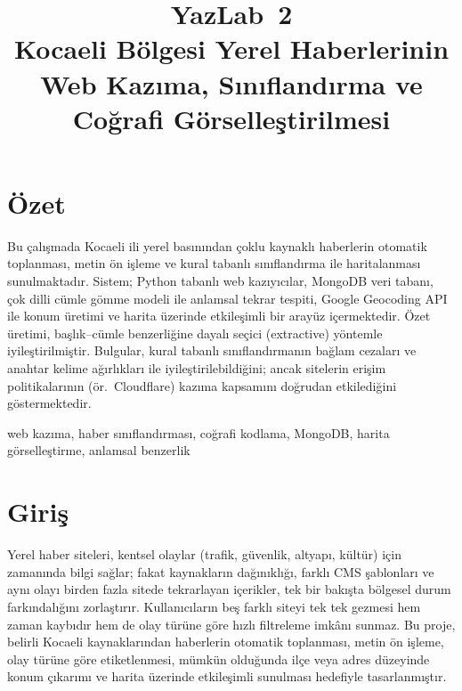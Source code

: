 \documentclass[conference,a4paper]{IEEEtran}
\begin{document}
\title{%
  {\large\bfseries YazLab~2}\\[0.55em]%
  Kocaeli Bölgesi Yerel Haberlerinin Web Kazıma, Sınıflandırma ve Coğrafi Görselleştirilmesi%
}

\author{
\and
{}
}

\maketitle

\section*{Özet}
{\normalfont\normalsize\mdseries\upshape
Bu çalışmada Kocaeli ili yerel basınından çoklu kaynaklı haberlerin otomatik toplanması, metin ön işleme ve kural tabanlı sınıflandırma ile haritalanması sunulmaktadır. Sistem; Python tabanlı web kazıyıcılar, MongoDB veri tabanı, çok dilli cümle gömme modeli ile anlamsal tekrar tespiti, Google Geocoding API ile konum üretimi ve harita üzerinde etkileşimli bir arayüz içermektedir. Özet üretimi, başlık--cümle benzerliğine dayalı seçici (extractive) yöntemle iyileştirilmiştir. Bulgular, kural tabanlı sınıflandırmanın bağlam cezaları ve anahtar kelime ağırlıkları ile iyileştirilebildiğini; ancak sitelerin erişim politikalarının (ör.\ Cloudflare) kazıma kapsamını doğrudan etkilediğini göstermektedir.
\par}

\begin{IEEEkeywords}
web kazıma, haber sınıflandırması, coğrafi kodlama, MongoDB, harita görselleştirme, anlamsal benzerlik
\end{IEEEkeywords}

\section{Giriş}
Yerel haber siteleri, kentsel olaylar (trafik, güvenlik, altyapı, kültür) için zamanında bilgi sağlar; fakat kaynakların dağınıklığı, farklı CMS şablonları ve aynı olayı birden fazla sitede tekrarlayan içerikler, tek bir bakışta bölgesel durum farkındalığını zorlaştırır. Kullanıcıların beş farklı siteyi tek tek gezmesi hem zaman kaybıdır hem de olay türüne göre hızlı filtreleme imkânı sunmaz. Bu proje, belirli Kocaeli kaynaklarından haberlerin otomatik toplanması, metin ön işleme, olay türüne göre etiketlenmesi, mümkün olduğunda ilçe veya adres düzeyinde konum çıkarımı ve harita üzerinde etkileşimli sunulması hedefiyle tasarlanmıştır.
\end{document}

